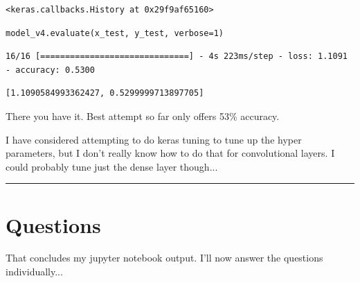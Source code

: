 \documentclass[
]{article}
\begin{document}
\begin{verbatim}
<keras.callbacks.History at 0x29f9af65160>
\end{verbatim}

\begin{verbatim}
model_v4.evaluate(x_test, y_test, verbose=1)
\end{verbatim}

\begin{verbatim}
16/16 [==============================] - 4s 223ms/step - loss: 1.1091 - accuracy: 0.5300
\end{verbatim}

\begin{verbatim}
[1.1090584993362427, 0.5299999713897705]
\end{verbatim}

There you have it. Best attempt so far only offers 53\% accuracy.

I have considered attempting to do keras tuning to tune up the hyper
parameters, but I don't really know how to do that for convolutional
layers. I could probably tune just the dense layer though...
\medskip
\hrule
\newpage

\section{Questions}
That concludes my jupyter notebook output. I'll now answer the questions
individually...
\end{document}
